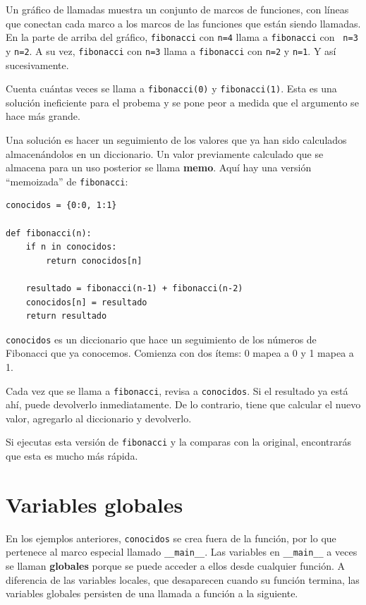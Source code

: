 \documentclass[10pt]{book}
\begin{document}
Un gráfico de llamadas muestra un conjunto de marcos de funciones, con líneas que conectan cada
marco a los marcos de las funciones que están siendo llamadas.  En la parte de arriba del
gráfico, {\tt fibonacci} con {\tt n=4} llama a {\tt fibonacci} con {\tt
n=3} y {\tt n=2}.  A su vez, {\tt fibonacci} con {\tt n=3} llama a
{\tt fibonacci} con {\tt n=2} y {\tt n=1}.  Y así sucesivamente.

Cuenta cuántas veces se llama a {\tt fibonacci(0)} y {\tt fibonacci(1)}.
Esta es una solución ineficiente para el probema y se pone peor
a medida que el argumento se hace más grande.


Una solución es hacer un seguimiento de los valores que ya han sido
calculados almacenándolos en un diccionario.   Un valor previamente calculado
que se almacena para un uso posterior se llama {\bf memo}.  Aquí hay una versión
``memoizada'' de {\tt fibonacci}:

\begin{verbatim}
conocidos = {0:0, 1:1}

def fibonacci(n):
    if n in conocidos:
        return conocidos[n]

    resultado = fibonacci(n-1) + fibonacci(n-2)
    conocidos[n] = resultado
    return resultado
\end{verbatim}
%
{\tt conocidos} es un diccionario que hace un seguimiento de los números de Fibonacci
que ya conocemos.  Comienza con
dos ítems: 0 mapea a 0 y 1 mapea a 1.

Cada vez que se llama a {\tt fibonacci}, revisa a {\tt conocidos}.
Si el resultado ya está ahí, puede devolverlo
inmediatamente.  De lo contrario, tiene que
calcular el nuevo valor, agregarlo al diccionario y devolverlo.

Si ejecutas esta versión de {\tt fibonacci} y la comparas con
la original, encontrarás que esta es mucho más rápida.



\section{Variables globales}

En los ejemplos anteriores, {\tt conocidos} se crea fuera de la función,
por lo que pertenece al marco especial llamado \verb"__main__".
Las variables en \verb"__main__" a veces se llaman {\bf globales}
porque se puede acceder a ellos desde cualquier función.  A diferencia de las variables
locales, que desaparecen cuando su función termina, las variables globales 
persisten de una llamada a función a la siguiente.
\end{document}
